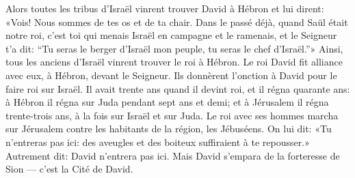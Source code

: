Alors toutes les tribus d’Israël vinrent trouver David à Hébron et lui dirent:
	«Vois! Nous sommes de tes os et de ta chair.
Dans le passé déjà, quand Saül était notre roi,
	c’est toi qui menais Israël en campagne et le ramenais, et le Seigneur t’a dit:
	“Tu seras le berger d’Israël mon peuple, tu seras le chef d’Israël.”»
Ainsi, tous les anciens d’Israël vinrent trouver le roi à Hébron.
Le roi David fit alliance avec eux, à Hébron, devant le Seigneur.
	Ils donnèrent l’onction à David pour le faire roi sur Israël.
Il avait trente ans quand il devint roi, et il régna quarante ans:
	à Hébron il régna sur Juda pendant sept ans et demi;
	et à Jérusalem il régna trente-trois ans, à la fois sur Israël et sur Juda.
Le roi avec ses hommes
		marcha sur Jérusalem contre les habitants de la région, les Jébuséens.
On lui dit: «Tu n’entreras pas ici:
	des aveugles et des boiteux suffiraient à te repousser.»
Autrement dit: David n’entrera pas ici.
Mais David s’empara de la forteresse de Sion --- c’est la Cité de David.
